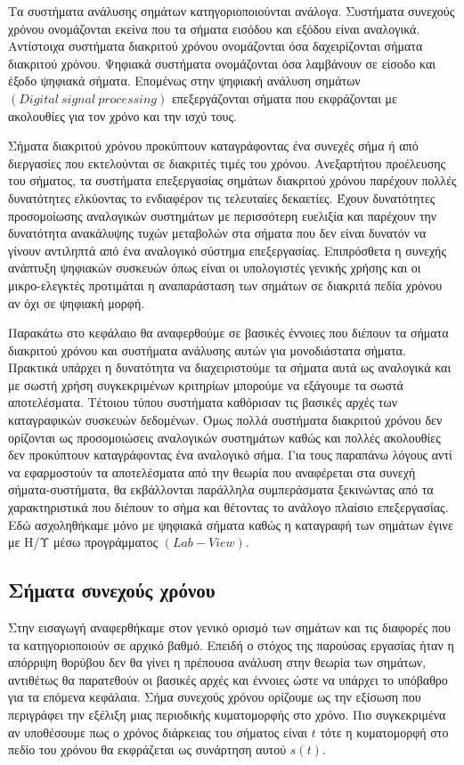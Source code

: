 \documentclass[breaklines=true, 12pt]{article}
\begin{document}
Τα συστήματα ανάλυσης σημάτων κατηγοριοποιούνται ανάλογα. Συστήματα συνεχούς
χρόνου ονομάζονται εκείνα που τα σήματα εισόδου και εξόδου είναι αναλογικά.
Αντίστοιχα συστήματα διακριτού χρόνου ονομάζονται όσα δαχειρίζονται σήματα
διακριτού χρόνου. Ψηφιακά συστήματα ονομάζονται όσα λαμβάνουν σε είσοδο και
έξοδο ψηφιακά σήματα. Επομένως στην ψηφιακή ανάλυση σημάτων
\({(Digital\ signal\ processing)}\) επεξεργάζονται σήματα που εκφράζονται
με ακολουθίες για τον χρόνο και την ισχύ τους.

Σήματα διακριτού χρόνου προκύπτουν καταγράφοντας ένα συνεχές σήμα ή από
διεργασίες που εκτελούνται σε διακριτές τιμές του χρόνου. Ανεξαρτήτου
προέλευσης του σήματος, τα συστήματα επεξεργασίας σημάτων διακριτού χρόνου
παρέχουν πολλές δυνατότητες ελκύοντας το ενδιαφέρον τις τελευταίες
δεκαετίες. Έχουν δυνατότητες προσομοίωσης αναλογικών συστημάτων με
περισσότερη ευελιξία και παρέχουν την δυνατότητα ανακάλυψης τυχών μεταβολών
στα σήματα που δεν είναι δυνατόν να γίνουν αντιληπτά από ένα αναλογικό
σύστημα επεξεργασίας. Επιπρόσθετα η συνεχής ανάπτυξη ψηφιακών συσκευών
όπως είναι οι υπολογιστές γενικής χρήσης και οι μικρο-ελεγκτές προτιμάται
η αναπαράσταση των σημάτων σε διακριτά πεδία χρόνου αν όχι σε ψηφιακή μορφή.

Παρακάτω στο κεφάλαιο θα αναφερθούμε σε βασικές έννοιες που διέπουν τα σήματα
διακριτού χρόνου και συστήματα ανάλυσης αυτών για μονοδιάστατα σήματα.
Πρακτικά υπάρχει η δυνατότητα να διαχειριστούμε τα σήματα αυτά ως αναλογικά
και με σωστή χρήση συγκεκριμένων κριτηρίων μπορούμε να εξάγουμε τα σωστά
αποτελέσματα. Τέτοιου τύπου συστήματα καθόρισαν τις βασικές αρχές των
καταγραφικών συσκευών δεδομένων. Όμως πολλά συστήματα διακριτού χρόνου
δεν ορίζονται ως προσομοιώσεις αναλογικών συστημάτων καθώς και πολλές
ακολουθίες δεν προκύπτουν καταγράφοντας ένα αναλογικό σήμα. Για τους
παραπάνω λόγους αντί να εφαρμοστούν τα αποτελέσματα από την θεωρία που
αναφέρεται στα συνεχή σήματα-συστήματα, θα εκβάλλονται παράλληλα συμπεράσματα
ξεκινώντας από τα χαρακτηριστικά που διέπουν το σήμα και θέτοντας το
ανάλογο πλαίσιο επεξεργασίας. Εδώ ασχοληθήκαμε μόνο με ψηφιακά σήματα
καθώς η καταγραφή των σημάτων έγινε με Η/Υ μέσω προγράμματος \({(Lab-View)}\).

\subsection{Σήματα συνεχούς χρόνου}
\label{sec:orgbe1819c}
Στην εισαγωγή αναφερθήκαμε στον γενικό ορισμό των σημάτων και τις διαφορές
που τα κατηγοριοποιούν σε αρχικό βαθμό. Επειδή ο στόχος της παρούσας εργασίας
ήταν η απόρριψη θορύβου δεν θα γίνει η πρέπουσα ανάλυση στην θεωρία των σημάτων,
αντιθέτως θα παρατεθούν οι βασικές αρχές και έννοιες ώστε να υπάρχει το υπόβαθρο
για τα επόμενα κεφάλαια. Σήμα συνεχούς χρόνου ορίζουμε ως την εξίσωση που
περιγράφει την εξέλιξη μιας περιοδικής κυματομορφής στο χρόνο. Πιο συγκεκριμένα
αν υποθέσουμε πως ο χρόνος διάρκειας του σήματος είναι \(t\) τότε η κυματομορφή στο
πεδίο του χρόνου θα εκφράζεται ως συνάρτηση αυτού \(s(t)\).
\end{document}
